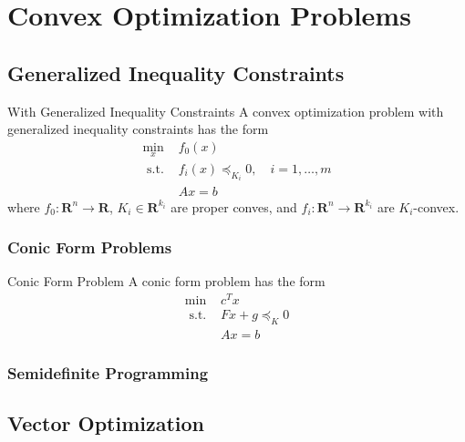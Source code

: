 \chapter{Convex Optimization Problems}

\section{Generalized Inequality Constraints}

\begin{definition}{With Generalized Inequality Constraints}{}
    A convex optimization problem with generalized inequality constraints has the form
    \begin{equation}
        \begin{array}{ll}
            \min_x & f_{0}(x) \\
            \text{ s.t. } & f_{i}(x)\preceq_{K_{i}}0,\quad i=1,\ldots,m \\
            & Ax=b
        \end{array}
    \end{equation}
    where $f_{0}:\mathbf{R}^n\rightarrow\mathbf{R}$, $K_i\in\mathbf{R}^{k_i}$ are proper conves, and $f_i:\mathbf{R}^n\rightarrow\mathbf{R}^{k_i}$ are $K_i$-convex.
\end{definition}

\subsection{Conic Form Problems}

\begin{definition}{Conic Form Problem}{}
    A conic form problem has the form
    \begin{equation}
        \begin{array}{ll}
            \min & c^{T}x \\
            \text{ s.t. } & Fx+g\preceq_{K}0 \\
            & Ax=b
        \end{array}
    \end{equation}
\end{definition}

\subsection{Semidefinite Programming}

\section{Vector Optimization}